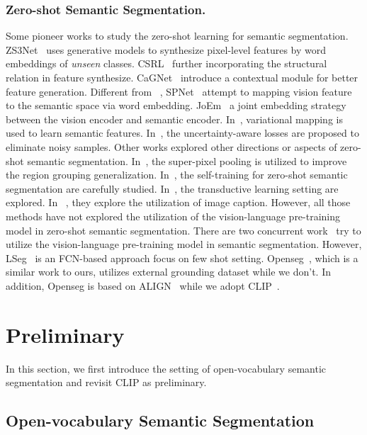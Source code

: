\documentclass[runningheads]{llncs}
\begin{document}
\subsubsection{Zero-shot Semantic Segmentation.}
Some pioneer works to study the zero-shot learning for semantic segmentation. ZS3Net~\cite{bucher2019zero} uses generative models to synthesize pixel-level features by word embeddings of \emph{unseen} classes. CSRL~\cite{li2020consistent} further incorporating the structural relation in feature synthesize.  CaGNet~\cite{gu2020context,gu2020pixel} introduce a contextual module for better feature generation. 
Different from ~\cite{bucher2019zero,li2020consistent,gu2020context}, SPNet~\cite{xian2019semantic} attempt to mapping vision feature to the semantic space via word embedding. JoEm~\cite{baek2021exploiting} a joint embedding strategy between the vision encoder and semantic encoder. In~\cite{kato2019zero}, variational mapping is used to learn semantic features. In~\cite{hu2020uncertainty}, the uncertainty-aware losses are proposed to eliminate noisy samples. Other works explored other directions or aspects of zero-shot semantic segmentation. In~\cite{sp2net}, the super-pixel pooling is utilized to improve the region grouping generalization. In~\cite{pastore2021closer}, the self-training for zero-shot semantic segmentation are carefully studied. In~\cite{song2018transductive,lv2020learning}, the transductive learning setting are explored. In~\cite{tian2020cap2seg} , they explore the utilization of image caption. However, all those methods have not explored the utilization of the vision-language pre-training model in zero-shot semantic segmentation. There are two concurrent work~\cite{li2022languagedriven,ghiasi2021open} try to utilize the vision-language pre-training model in semantic segmentation. However, LSeg~\cite{li2022languagedriven} is an FCN-based
approach focus on few shot setting. Openseg~\cite{ghiasi2021open}, which is a similar work to ours, utilizes external grounding dataset while we don’t. In addition, Openseg is based on ALIGN~\cite{jia2021scaling} while we adopt CLIP~\cite{radford2021learning}.


\section{Preliminary}
In this section, we first introduce the setting of open-vocabulary semantic segmentation and revisit CLIP as preliminary.

\subsection{Open-vocabulary Semantic Segmentation}
\end{document}
